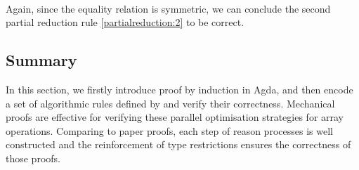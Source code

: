 \documentclass{l4proj}
\begin{document}
\begin{code}
\AgdaSymbol{=}\<%
\\
\>[0][@{}l@{\AgdaIndent{0}}]%
\>[2]\<%
\\
\>[2][@{}l@{\AgdaIndent{0}}]%
\>[4]\AgdaSpace{}%
\AgdaSymbol{(}\AgdaSpace{}%
\AgdaSymbol{(}\AgdaSpace{}%
\AgdaSpace{}%
\AgdaSymbol{\{}\AgdaSymbol{\}}\AgdaSpace{}%
\AgdaSymbol{)}\AgdaSpace{}%
\AgdaSymbol{(}\AgdaSpace{}%
\AgdaSpace{}%
\AgdaSymbol{\{}\AgdaSpace{}%
\AgdaSymbol{\}}\AgdaSpace{}%
\AgdaSymbol{))}\<%
\\
%
\>[2]\AgdaSpace{}%
\AgdaSpace{}%
\AgdaSymbol{\{}\AgdaSymbol{\}}\AgdaSpace{}%
\AgdaSpace{}%
%
\>[31]\AgdaSymbol{(}\AgdaSpace{}%
\AgdaSpace{}%
\AgdaSymbol{\{}\AgdaSpace{}%
\AgdaSymbol{\}}\AgdaSpace{}%
\AgdaSymbol{)}\AgdaSpace{}%
\<%
\\
\>[2][@{}l@{\AgdaIndent{0}}]%
\>[4]\AgdaSpace{}%
\AgdaSpace{}%
\AgdaSpace{}%
\AgdaSymbol{(}\AgdaSpace{}%
\AgdaSymbol{(}\AgdaSpace{}%
\AgdaSpace{}%
\AgdaSymbol{\{}\AgdaSpace{}%
\AgdaSymbol{\}}\AgdaSpace{}%
\AgdaSymbol{))}\<%
\\
%
\>[2]\AgdaSpace{}%
\AgdaSpace{}%
\AgdaSymbol{(}\AgdaSpace{}%
\AgdaSpace{}%
\AgdaSymbol{)}\AgdaSpace{}%
\AgdaSymbol{(}\AgdaSpace{}%
\AgdaSpace{}%
\AgdaSymbol{\{}\AgdaSpace{}%
\AgdaSymbol{\}}\AgdaSpace{}%
\AgdaSymbol{)}\AgdaSpace{}%
\<%
\\
\>[2][@{}l@{\AgdaIndent{0}}]%
\>[4]\<%
\end{code}
Again, since the equality relation is symmetric, we can conclude the second partial reduction rule \ref{partialreduction:2} to be correct.

\subsection{Summary}
In this section, we firstly introduce proof by induction in Agda, and then encode a set of algorithmic rules defined by \cite{steuwer2015improving} and verify their correctness. Mechanical proofs are effective for verifying these parallel optimisation strategies for array operations. Comparing to paper proofs, each step of reason processes is well constructed and the reinforcement of type restrictions ensures the correctness of those proofs.
\end{document}
